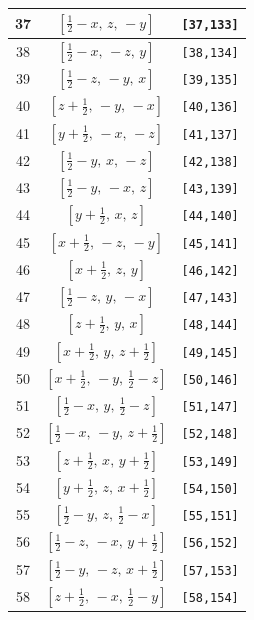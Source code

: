 \documentclass[fleqn,8pt]{jsarticle}
\begin{document}
\begin{longtable}{ccc}
37 & $\left[ \frac{1}{2} - x,\, z,\, - y \right]$ & {\tt [37,133]} \\ \hline
38 & $\left[ \frac{1}{2} - x,\, - z,\, y \right]$ & {\tt [38,134]} \\ \hline
39 & $\left[ \frac{1}{2} - z,\, - y,\, x \right]$ & {\tt [39,135]} \\ \hline
40 & $\left[ z + \frac{1}{2},\, - y,\, - x \right]$ & {\tt [40,136]} \\ \hline
41 & $\left[ y + \frac{1}{2},\, - x,\, - z \right]$ & {\tt [41,137]} \\ \hline
42 & $\left[ \frac{1}{2} - y,\, x,\, - z \right]$ & {\tt [42,138]} \\ \hline
43 & $\left[ \frac{1}{2} - y,\, - x,\, z \right]$ & {\tt [43,139]} \\ \hline
44 & $\left[ y + \frac{1}{2},\, x,\, z \right]$ & {\tt [44,140]} \\ \hline
45 & $\left[ x + \frac{1}{2},\, - z,\, - y \right]$ & {\tt [45,141]} \\ \hline
46 & $\left[ x + \frac{1}{2},\, z,\, y \right]$ & {\tt [46,142]} \\ \hline
47 & $\left[ \frac{1}{2} - z,\, y,\, - x \right]$ & {\tt [47,143]} \\ \hline
48 & $\left[ z + \frac{1}{2},\, y,\, x \right]$ & {\tt [48,144]} \\ \hline
49 & $\left[ x + \frac{1}{2},\, y,\, z + \frac{1}{2} \right]$ & {\tt [49,145]} \\ \hline
50 & $\left[ x + \frac{1}{2},\, - y,\, \frac{1}{2} - z \right]$ & {\tt [50,146]} \\ \hline
51 & $\left[ \frac{1}{2} - x,\, y,\, \frac{1}{2} - z \right]$ & {\tt [51,147]} \\ \hline
52 & $\left[ \frac{1}{2} - x,\, - y,\, z + \frac{1}{2} \right]$ & {\tt [52,148]} \\ \hline
53 & $\left[ z + \frac{1}{2},\, x,\, y + \frac{1}{2} \right]$ & {\tt [53,149]} \\ \hline
54 & $\left[ y + \frac{1}{2},\, z,\, x + \frac{1}{2} \right]$ & {\tt [54,150]} \\ \hline
55 & $\left[ \frac{1}{2} - y,\, z,\, \frac{1}{2} - x \right]$ & {\tt [55,151]} \\ \hline
56 & $\left[ \frac{1}{2} - z,\, - x,\, y + \frac{1}{2} \right]$ & {\tt [56,152]} \\ \hline
57 & $\left[ \frac{1}{2} - y,\, - z,\, x + \frac{1}{2} \right]$ & {\tt [57,153]} \\ \hline
58 & $\left[ z + \frac{1}{2},\, - x,\, \frac{1}{2} - y \right]$ & {\tt [58,154]} \\ \hline

\end{longtable}
\end{document}
